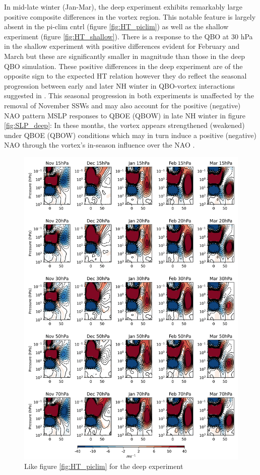 In mid-late winter (Jan-Mar), the deep experiment exhibits remarkably large positive composite differences in the vortex region. This notable feature is largely absent in the pi-clim cntrl (figure \ref{fig:HT_piclim}) as well as the shallow experiment (figure \ref{fig:HT_shallow}). There is a response to the QBO at 30 hPa in the shallow experiment with positive differences evident for February and March but these are significantly smaller in magnitude than those in the deep QBO simulation. These positive differences in the deep experiment are of the opposite sign to the expected HT relation however they do reflect the seasonal progression between early and later NH winter in QBO-vortex interactions suggested in \cite{graySurface2018b}. This seasonal progression in both experiments is unaffected by the removal of November SSWs and may also account for the positive (negative) NAO pattern MSLP responses to QBOE (QBOW) in late NH winter in figure \ref{fig:SLP_deep}: In these months, the vortex appears strengthened (weakened) under QBOE (QBOW) conditions which may in turn induce a positive (negative) NAO through the vortex's in-season influence over the NAO \citep{baldwinStratospheric2001a, charlton-perezInfluence2018e}. 

\newpage
\begin{figure}[h!]
\begin{center}
\noindent\includegraphics[width = 0.9\linewidth]{Figures/Figures-deepQBO/ZMZW_composites_by_month_QBO_phases_U_d_higher_MarQBO_vs_Mar_70hPa_5thresh.png}
\caption[ZMZW composites under different QBO phases in the deep QBO simulation]{Like figure \ref{fig:HT_piclim} for the deep experiment}
\label{fig:HT_deep}
\end{center}
\end{figure}
\newpage 


